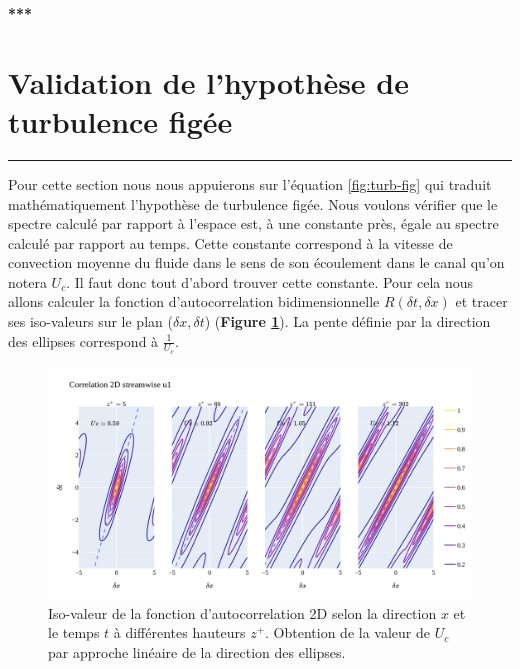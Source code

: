 \documentclass[12pt]{article}   %
\theoremstyle{plain}
\theoremstyle{remark}
\begin{document}
\begin{center}
	\large {\bf{***}}
\end{center}

\vspace{0.3cm}
\section{Validation de l'hypothèse de turbulence figée}
\noindent\rule{\linewidth}{2pt}
\vspace{0.1cm}

Pour cette section nous nous appuierons sur l'équation \ref{fig:turb-fig} qui traduit mathématiquement l'hypothèse de turbulence figée. Nous voulons vérifier que le spectre calculé par rapport à l'espace est, à une constante près, égale au spectre calculé par rapport au temps. Cette constante correspond à la vitesse de convection moyenne du fluide dans le sens de son écoulement dans le canal qu'on notera $U_c$. Il faut donc tout d'abord trouver cette constante. Pour cela nous allons calculer la fonction d'autocorrelation bidimensionnelle $R(\delta t, \delta x)$ et tracer ses iso-valeurs sur le plan ($\delta x, \delta t$) ({\bf Figure \ref{fig:corr-2d}}). La pente définie par la direction des ellipses correspond à $\frac{1}{U_c}$.

\begin{figure}[H]
	\begin{center}
		\includegraphics[width=0.9\linewidth]{../../output/figures/channel_wrles_retau395/split_time/frozen_turbulence/correlation2D/u1.png}
		\caption{Iso-valeur de la fonction d'autocorrelation 2D selon la direction $x$ et le temps $t$ à différentes hauteurs $z^+$. Obtention de la valeur de $U_c$ par approche linéaire de la direction des ellipses.}
		\label{fig:corr-2d}
	\end{center}
\end{figure}
\end{document}
